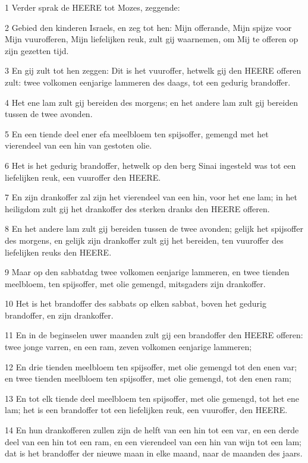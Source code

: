 \par 1 Verder sprak de HEERE tot Mozes, zeggende:
\par 2 Gebied den kinderen Israels, en zeg tot hen: Mijn offerande, Mijn spijze voor Mijn vuurofferen, Mijn liefelijken reuk, zult gij waarnemen, om Mij te offeren op zijn gezetten tijd.
\par 3 En gij zult tot hen zeggen: Dit is het vuuroffer, hetwelk gij den HEERE offeren zult: twee volkomen eenjarige lammeren des daags, tot een gedurig brandoffer.
\par 4 Het ene lam zult gij bereiden des morgens; en het andere lam zult gij bereiden tussen de twee avonden.
\par 5 En een tiende deel ener efa meelbloem ten spijsoffer, gemengd met het vierendeel van een hin van gestoten olie.
\par 6 Het is het gedurig brandoffer, hetwelk op den berg Sinai ingesteld was tot een liefelijken reuk, een vuuroffer den HEERE.
\par 7 En zijn drankoffer zal zijn het vierendeel van een hin, voor het ene lam; in het heiligdom zult gij het drankoffer des sterken dranks den HEERE offeren.
\par 8 En het andere lam zult gij bereiden tussen de twee avonden; gelijk het spijsoffer des morgens, en gelijk zijn drankoffer zult gij het bereiden, ten vuuroffer des liefelijken reuks den HEERE.
\par 9 Maar op den sabbatdag twee volkomen eenjarige lammeren, en twee tienden meelbloem, ten spijsoffer, met olie gemengd, mitsgaders zijn drankoffer.
\par 10 Het is het brandoffer des sabbats op elken sabbat, boven het gedurig brandoffer, en zijn drankoffer.
\par 11 En in de beginselen uwer maanden zult gij een brandoffer den HEERE offeren: twee jonge varren, en een ram, zeven volkomen eenjarige lammeren;
\par 12 En drie tienden meelbloem ten spijsoffer, met olie gemengd tot den enen var; en twee tienden meelbloem ten spijsoffer, met olie gemengd, tot den enen ram;
\par 13 En tot elk tiende deel meelbloem ten spijsoffer, met olie gemengd, tot het ene lam; het is een brandoffer tot een liefelijken reuk, een vuuroffer, den HEERE.
\par 14 En hun drankofferen zullen zijn de helft van een hin tot een var, en een derde deel van een hin tot een ram, en een vierendeel van een hin van wijn tot een lam; dat is het brandoffer der nieuwe maan in elke maand, naar de maanden des jaars.
